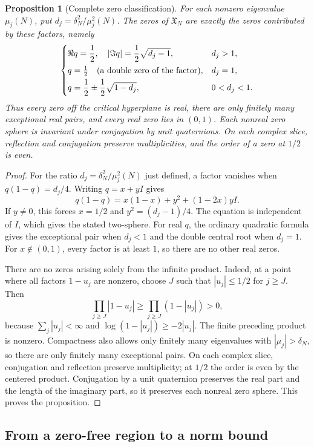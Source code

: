 \documentclass[12pt,a4paper]{amsart}
\numberwithin{equation}{section}
\def\le{\leqslant}
\def\ge{\geqslant}
\theoremstyle{plain}
\newtheorem{proposition}{Proposition}[section]
\theoremstyle{definition}
\theoremstyle{remark}
\begin{document}
\begin{proposition}[Complete zero classification]
\label{proof:v9:spectral-zeros}
For each nonzero eigenvalue $\mu_j(N)$, put
$d_j=\delta_N^2/\mu_j^2(N)$. The zeros of $\mathfrak X_N$ are
exactly the zeros contributed by these factors, namely
\[
 \begin{cases}
 \displaystyle \Re q=\frac12,\quad
       |\Im q|=\frac12\sqrt{d_j-1},&d_j>1,\\[2mm]
 q=\frac12\quad\text{\normalfont (a double zero of the factor)},&d_j=1,\\[1mm]
 \displaystyle q=\frac12\pm\frac12\sqrt{1-d_j},&0<d_j<1.
 \end{cases}
\]
Thus every zero off the critical hyperplane is real, there are only
finitely many exceptional real pairs, and every real zero lies in
$(0,1)$. Each nonreal zero sphere is invariant under conjugation by
unit quaternions. On each complex slice, reflection and conjugation
preserve multiplicities, and the order of a zero at $1/2$ is even.
\end{proposition}

\begin{proof}
For the ratio $d_j=\delta_N^2/\mu_j^2(N)$ just defined, a
factor vanishes when $q(1-q)=d_j/4$. Writing $q=x+yI$ gives
\[
 q(1-q)=x(1-x)+y^2+(1-2x)yI.
\]
If $y\ne0$, this forces $x=1/2$ and $y^2=(d_j-1)/4$.
The equation is independent of $I$, which gives the stated two-sphere.
For real $q$, the ordinary quadratic formula gives the exceptional
pair when $d_j<1$ and the double central root when $d_j=1$.
For $x\notin(0,1)$, every factor is at least $1$, so there are no
other real zeros.

There are no zeros arising solely from the infinite product. Indeed,
at a point where all factors $1-u_j$ are nonzero, choose $J$ such that
$|u_j|\le1/2$ for $j\ge J$. Then
\[
 \prod_{j\ge J}|1-u_j|
 \ge\prod_{j\ge J}(1-|u_j|)>0,
\]
because $\sum_j|u_j|<\infty$ and
$\log(1-|u_j|)\ge-2|u_j|$. The finite preceding product is nonzero.
Compactness also allows only finitely many eigenvalues with
$|\mu_j|>\delta_N$, so there are only finitely many exceptional pairs.
On each complex slice, conjugation and reflection preserve multiplicity;
at $1/2$ the order is even by the centered product.
Conjugation by a unit quaternion preserves the real part and the
length of the imaginary part, so it preserves each nonreal zero sphere.
This proves the proposition.
\end{proof}

\subsection{From a zero-free region to a norm bound}
\end{document}
